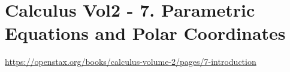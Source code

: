 \section{Calculus Vol2 - 7. Parametric Equations and Polar Coordinates}

\url{https://openstax.org/books/calculus-volume-2/pages/7-introduction}


\clearpage

\clearpage

\clearpage

\clearpage

\clearpage
